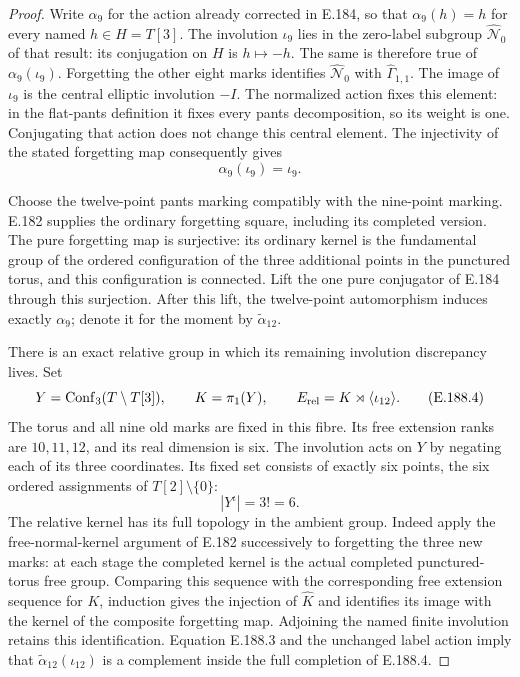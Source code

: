 \begin{proof}
Write \(\alpha_9\) for the action already corrected in E.184,
so that \(\alpha_9(h)=h\) for every named \(h\in H=T[3]\).
The involution \(\iota_9\) lies in the zero-label subgroup
\(\widehat{\mathcal N}_0\) of that result: its conjugation on
\(H\) is \(h\mapsto-h\).  The same is therefore true of
\(\alpha_9(\iota_9)\).
Forgetting the other eight marks identifies
\(\widehat{\mathcal N}_0\) with \(\widehat\Gamma_{1,1}\).
The image of \(\iota_9\) is the central elliptic involution
\(-I\).  The normalized action fixes this element:
in the flat-pants definition it fixes every pants
decomposition, so its weight is one.  Conjugating that
action does not change this central element.
The injectivity of the stated forgetting map consequently gives
\[
                         \alpha_9(\iota_9)=\iota_9.
\tag{E.188.3}
\]

Choose the twelve-point pants marking compatibly with the
nine-point marking.  E.182 supplies the ordinary forgetting
square, including its completed version.  The pure forgetting
map is surjective: its ordinary kernel is the fundamental
group of the ordered configuration of the three additional
points in the punctured torus, and this configuration is
connected.  Lift the one pure conjugator of E.184 through
this surjection.  After this lift, the twelve-point
automorphism induces exactly \(\alpha_9\); denote it for
the moment by \(\widetilde\alpha_{12}\).

There is an exact relative group in which its remaining
involution discrepancy lives.  Set
\[
 Y=\operatorname{Conf}_3(T\setminus T[3]),\qquad
 K=\pi_1(Y),\qquad E_{\rm rel}=K\rtimes\langle\iota_{12}\rangle.
\tag{E.188.4}
\]
The torus and all nine old marks are fixed in this fibre.
Its free extension ranks are \(10,11,12\), and its real
dimension is six.  The involution acts on \(Y\) by
negating each of its three coordinates.  Its fixed set
consists of exactly six points, the six ordered assignments
of \(T[2]\setminus\{0\}\):
\[
                         |Y^\iota|=3!=6.
\tag{E.188.5}
\]
The relative kernel has its full topology in the ambient
group.  Indeed apply the free-normal-kernel argument of
E.182 successively to forgetting the three new marks:
at each stage the completed kernel is the actual
completed punctured-torus free group.  Comparing this
sequence with the corresponding free extension sequence
for \(K\), induction gives the injection of
\(\widehat K\) and identifies its image with the kernel
of the composite forgetting map.  Adjoining the named
finite involution retains this identification.
Equation E.188.3 and the unchanged label action imply that
\(\widetilde\alpha_{12}(\iota_{12})\) is a complement
inside the full completion of E.188.4.


\end{proof}
